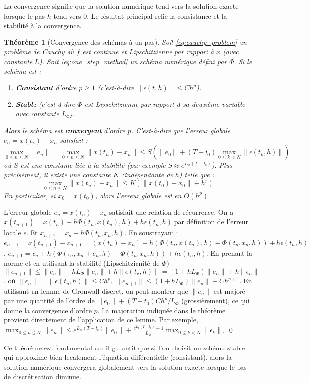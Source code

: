 \documentclass{article}
\newtheorem{theorem}{Théorème}
\newenvironment{proof}[1][Preuve]{\begin{trivlist}
\item[\hskip \labelsep {\bfseries #1}]}{\qed\end{trivlist}}
\begin{document}
La convergence signifie que la solution numérique tend vers la solution exacte lorsque le pas $h$ tend vers 0. Le résultat principal relie la consistance et la stabilité à la convergence.

\begin{theorem}[Convergence des schémas à un pas]
Soit \eqref{eq:cauchy_problem} un problème de Cauchy où $f$ est continue et Lipschitzienne par rapport à $x$ (avec constante $L$). Soit \eqref{eq:one_step_method} un schéma numérique défini par $\Phi$.
Si le schéma est :
\begin{enumerate}
    \item \textbf{Consistant} d'ordre $p \ge 1$ (c'est-à-dire $\|\epsilon(t, h)\| \le C h^p$).
    \item \textbf{Stable} (c'est-à-dire $\Phi$ est Lipschitzienne par rapport à sa deuxième variable avec constante $L_\Phi$).
\end{enumerate}
Alors le schéma est \textbf{convergent} d'ordre $p$. C'est-à-dire que l'erreur globale $e_n = x(t_n) - x_n$ satisfait :
\begin{equation*}
 \max_{0 \le n \le N} \|e_n\| = \max_{0 \le n \le N} \|x(t_n) - x_n\| \le S \left( \|e_0\| + (T-t_0) \max_{0 \le k < N} \|\epsilon(t_k, h)\| \right)
\end{equation*}
où $S$ est une constante liée à la stabilité (par exemple $S \approx e^{L_\Phi(T-t_0)}$).
Plus précisément, il existe une constante $K$ (indépendante de $h$) telle que :
\begin{equation*}
 \max_{0 \le n \le N} \|x(t_n) - x_n\| \le K (\|x(t_0) - x_0\| + h^p)
\end{equation*}
En particulier, si $x_0 = x(t_0)$, alors l'erreur globale est en $O(h^p)$.
\end{theorem}

\begin{proof}[Idée de la preuve]
L'erreur globale $e_n = x(t_n) - x_n$ satisfait une relation de récurrence.
On a $x(t_{n+1}) = x(t_n) + h \Phi(t_n, x(t_n), h) + h \epsilon(t_n, h)$ par définition de l'erreur locale $\epsilon$.
Et $x_{n+1} = x_n + h \Phi(t_n, x_n, h)$.
En soustrayant :
$e_{n+1} = x(t_{n+1}) - x_{n+1} = (x(t_n) - x_n) + h (\Phi(t_n, x(t_n), h) - \Phi(t_n, x_n, h)) + h \epsilon(t_n, h)$.
$e_{n+1} = e_n + h (\Phi(t_n, x_n + e_n, h) - \Phi(t_n, x_n, h)) + h \epsilon(t_n, h)$.
En prenant la norme et en utilisant la stabilité (Lipschitzianité de $\Phi$) :
$\|e_{n+1}\| \le \|e_n\| + h L_\Phi \|e_n\| + h \|\epsilon(t_n, h)\| = (1 + h L_\Phi) \|e_n\| + h \|\epsilon_n\|$.
où $\|\epsilon_n\| = \|\epsilon(t_n, h)\| \le C h^p$.
$\|e_{n+1}\| \le (1 + h L_\Phi) \|e_n\| + C h^{p+1}$.
En utilisant un lemme de Gronwall discret, on peut montrer que $\|e_n\|$ est majoré par une quantité de l'ordre de $\|e_0\| + (T-t_0) C h^p / L_\Phi$ (grossièrement), ce qui donne la convergence d'ordre $p$.
La majoration indiquée dans le théorème provient directement de l'application de ce lemme. Par exemple, $\max_{0 \le n \le N} \|e_n\| \le e^{L_\Phi(T-t_0)} \|e_0\| + \frac{e^{L_\Phi(T-t_0)}-1}{L_\Phi} \max_{0\le k < N} \|\epsilon_k\|$.
\end{proof}

Ce théorème est fondamental car il garantit que si l'on choisit un schéma stable qui approxime bien localement l'équation différentielle (consistant), alors la solution numérique convergera globalement vers la solution exacte lorsque le pas de discrétisation diminue.
\end{document}
